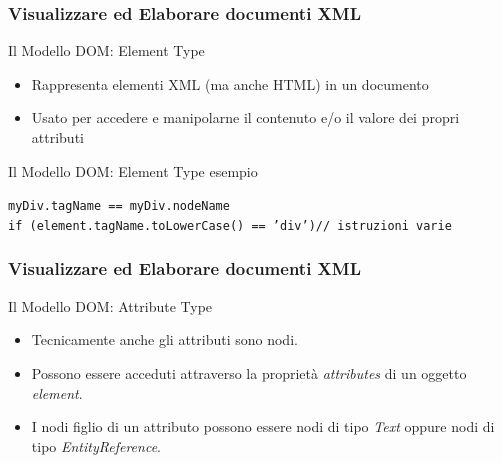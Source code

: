 \begin{frame}
    \frametitle{Visualizzare ed Elaborare documenti XML}
    \addtocounter{nframe}{1}
    

     \begin{block}{Il Modello DOM: Element Type}
        \begin{itemize}
            \item Rappresenta elementi XML (ma anche HTML) in un documento
            \item Usato per accedere e manipolarne il contenuto e/o il valore dei propri attributi 
        \end{itemize}
     \end{block}

     \begin{block}{Il Modello DOM: Element Type esempio}

        \texttt{myDiv.tagName == myDiv.nodeName}
        \\\texttt{if (element.tagName.toLowerCase() == 'div'){// istruzioni varie}}
       
     \end{block}

\end{frame}

\begin{frame}
    \frametitle{Visualizzare ed Elaborare documenti XML}
    \addtocounter{nframe}{1}

     \begin{block}{Il Modello DOM: Attribute Type}
        \begin{itemize}
            \item Tecnicamente anche gli attributi sono nodi. 
            \item Possono essere acceduti attraverso la proprietà \textit{attributes} di un oggetto \textit{element}.
            \item I nodi figlio di un attributo possono essere nodi di tipo \textit{Text} oppure nodi di tipo \textit{EntityReference}.
        \end{itemize}
     \end{block}

\end{frame}


